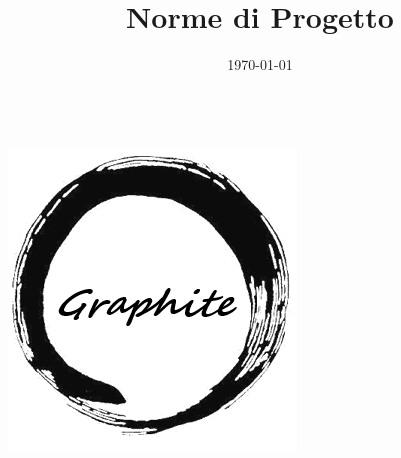 \documentclass[openany,12pt,a4paper]{report}
\title{Norme di Progetto}
\author{}
\date{\today}
\begin{document}
	\makeatletter
	\begin{titlepage}
		\begin{center}
			{\huge \bfseries  \@title }\\[15ex] 
			\includegraphics[width=0.5\linewidth]{./img/logo.png}\\
			[40ex] 
			{\large \@date}
		\end{center}
	\end{titlepage}
	\makeatother
	\thispagestyle{empty}
	\newpage
	\tableofcontents
	
	

	
\end{document}

